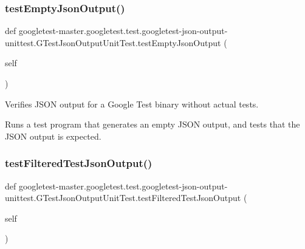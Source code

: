 \subsubsection{\texorpdfstring{testEmptyJsonOutput()}{testEmptyJsonOutput()}}
{\footnotesize\ttfamily def googletest-\/master.\+googletest.\+test.\+googletest-\/json-\/output-\/unittest.\+G\+Test\+Json\+Output\+Unit\+Test.\+test\+Empty\+Json\+Output (\begin{DoxyParamCaption}\item[{}]{self }\end{DoxyParamCaption})}

\begin{DoxyVerb}Verifies JSON output for a Google Test binary without actual tests.

Runs a test program that generates an empty JSON output, and
tests that the JSON output is expected.
\end{DoxyVerb}
 \mbox{\label{classgoogletest-master_1_1googletest_1_1test_1_1googletest-json-output-unittest_1_1_g_test_json_output_unit_test_a3b37c4ad862cd7126b9e2bf6907574d7}} 
\subsubsection{\texorpdfstring{testFilteredTestJsonOutput()}{testFilteredTestJsonOutput()}}
{\footnotesize\ttfamily def googletest-\/master.\+googletest.\+test.\+googletest-\/json-\/output-\/unittest.\+G\+Test\+Json\+Output\+Unit\+Test.\+test\+Filtered\+Test\+Json\+Output (\begin{DoxyParamCaption}\item[{}]{self }\end{DoxyParamCaption})}

